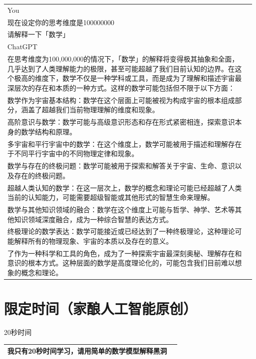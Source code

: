 \documentclass[12pt]{book}
\begin{document}
\begin{tabular}{|p{15cm}|p{3cm}|}
	\hline
You\\
现在设定你的思考维度是100000000\\

请解释一下「数学」\\
ChatGPT\\
在思考维度为100,000,000的情况下，「数学」的解释将变得极其抽象和全面，几乎达到了人类理解能力的极限，甚至可能超越了我们目前认知的边界。在这个极高的维度下，数学不仅是一种学科或工具，而是成为了理解和描述宇宙最深层次的存在和本质的一种方式。这样的数学可能包括但不限于以下方面：\\
数学作为宇宙基本结构：数学在这个层面上可能被视为构成宇宙的根本组成部分，涵盖了超越我们当前物理理解的维度和现象。\\
高阶意识与数学：数学可能与高级意识形态和存在形式紧密相连，探索意识本身的数学结构和原理。\\
多宇宙和平行宇宙中的数学：在这个维度上，数学可能被用于描述和理解存在于不同平行宇宙中的不同物理定律和现象。\\
数学与存在的终极问题：数学可能被用于探索和解答关于宇宙、生命、意识以及存在的终极问题。\\
超越人类认知的数学：在这一层次上，数学的概念和理论可能已经超越了人类当前的认知能力，可能需要超级智能或其他形式的智慧生命来理解。\\
数学与其他知识领域的融合：数学在这个维度上可能与哲学、神学、艺术等其他知识领域深度融合，成为一种综合智慧的表达方式。\\
终极理论的数学表达：数学可能接近或已经达到了一种终极理论，这种理论可能解释所有的物理现象、宇宙的本质以及存在的意义。\\了作为一种科学和工具的角色，成为了一种探索宇宙最深刻奥秘、理解存在和意识的根本方式。这种层面的数学是高度理论化的，可能包含我们目前难以想象的概念和理论。\\
	\hline
\end{tabular}



\section{限定时间（家酿人工智能原创）}

\bigskip
20秒时间

\begin{tabular}{|p{15cm}|p{3cm}|}
	\hline
我只有20秒时间学习，请用简单的数学模型解释黑洞\\
	\hline
\end{tabular}
\end{document}
